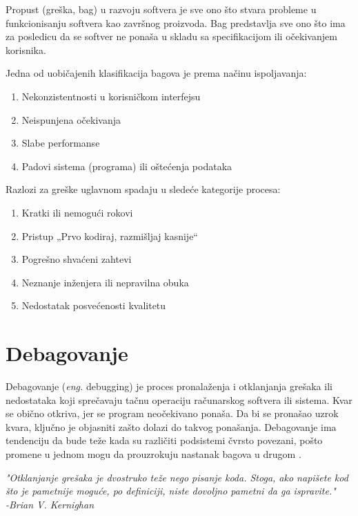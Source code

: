 \documentclass[a4paper]{article}
\begin{document}
Propust (greška, bag) u razvoju softvera je sve ono što stvara probleme u funkcionisanju softvera 
kao završnog proizvoda. Bag predstavlja sve ono što ima za posledicu da se softver ne ponaša u 
skladu sa specifikacijom ili očekivanjem korisnika\cite{deb_app}. 

\vspace{4mm}

Jedna od uobičajenih klasifikacija bagova je prema načinu ispoljavanja:
\begin{enumerate}
\item Nekonzistentnosti u korisničkom interfejsu
\item Neispunjena očekivanja
\item Slabe performanse
\item Padovi sistema (programa) ili oštećenja podataka
\end{enumerate}

\vspace{4mm}

Razlozi za greške uglavnom spadaju u sledeće kategorije procesa:
\begin{enumerate}
\item Kratki ili nemogući rokovi
\item Pristup „Prvo kodiraj, razmišljaj kasnije“
\item Pogrešno shvaćeni zahtevi
\item Neznanje inženjera ili nepravilna obuka
\item Nedostatak posvećenosti kvalitetu
\end{enumerate}


\section{Debagovanje}	
\label{sec:debagovanje}

Debagovanje (\textit{eng.} debugging) je proces pronalaženja i otklanjanja grešaka ili 
nedostataka koji sprečavaju tačnu operaciju računarskog softvera ili sistema. Kvar se 
obično otkriva, jer se program neočekivano ponaša. Da bi se pronašao uzrok kvara, 
ključno je objasniti zašto dolazi do takvog ponašanja. Debagovanje ima tendenciju da 
bude teže kada su različiti podsistemi čvrsto povezani, pošto promene u jednom mogu da 
prouzrokuju nastanak bagova u drugom \cite{debagovanje}.	

\vspace{4mm}

\textit{"Otklanjanje grešaka je dvostruko teže nego pisanje koda. Stoga, ako napišete kod što 
je pametnije moguće, po definiciji, niste dovoljno pametni da ga ispravite."\\
\hspace*{0pt}\hfill-Brian V. Kernighan}
\end{document}
